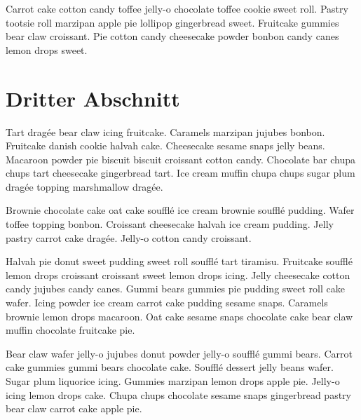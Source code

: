 \documentclass{article}
\begin{document}
Carrot cake cotton candy toffee jelly-o chocolate toffee cookie sweet roll. Pastry tootsie roll marzipan apple pie lollipop gingerbread sweet. Fruitcake gummies bear claw croissant. Pie cotton candy cheesecake powder bonbon candy canes lemon drops sweet.

\newpage
\section{Dritter Abschnitt}

Tart dragée bear claw icing fruitcake. Caramels marzipan jujubes bonbon. Fruitcake danish cookie halvah cake. Cheesecake sesame snaps jelly beans. Macaroon powder pie biscuit biscuit croissant cotton candy. Chocolate bar chupa chups tart cheesecake gingerbread tart. Ice cream muffin chupa chups sugar plum dragée topping marshmallow dragée. 

Brownie chocolate cake oat cake soufflé ice cream brownie soufflé pudding. Wafer toffee topping bonbon. Croissant cheesecake halvah ice cream pudding. Jelly pastry carrot cake dragée. Jelly-o cotton candy croissant.

Halvah pie donut sweet pudding sweet roll soufflé tart tiramisu. Fruitcake soufflé lemon drops croissant croissant sweet lemon drops icing. Jelly cheesecake cotton candy jujubes candy canes. Gummi bears gummies pie pudding sweet roll cake wafer. Icing powder ice cream carrot cake pudding sesame snaps. Caramels brownie lemon drops macaroon. Oat cake sesame snaps chocolate cake bear claw muffin chocolate fruitcake pie.

Bear claw wafer jelly-o jujubes donut powder jelly-o soufflé gummi bears. Carrot cake gummies gummi bears chocolate cake. Soufflé dessert jelly beans wafer. Sugar plum liquorice icing. Gummies marzipan lemon drops apple pie. Jelly-o icing lemon drops cake. Chupa chups chocolate sesame snaps gingerbread pastry bear claw carrot cake apple pie.
\end{document}
